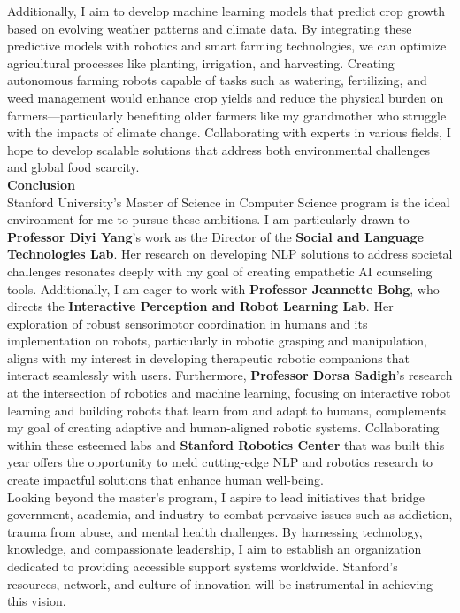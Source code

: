 \documentclass{article}
\begin{document}
Additionally, I aim to develop machine learning models that predict crop growth based on evolving weather patterns and climate data. By integrating these predictive models with robotics and smart farming technologies, we can optimize agricultural processes like planting, irrigation, and harvesting. Creating autonomous farming robots capable of tasks such as watering, fertilizing, and weed management would enhance crop yields and reduce the physical burden on farmers—particularly benefiting older farmers like my grandmother who struggle with the impacts of climate change. Collaborating with experts in various fields, I hope to develop scalable solutions that address both environmental challenges and global food scarcity.
\\

\textbf{Conclusion} \\
Stanford University's Master of Science in Computer Science program is the ideal environment for me to pursue these ambitions. I am particularly drawn to \textbf{Professor Diyi Yang}'s work as the Director of the \textbf{Social and Language Technologies Lab}. Her research on developing NLP solutions to address societal challenges resonates deeply with my goal of creating empathetic AI counseling tools. Additionally, I am eager to work with \textbf{Professor Jeannette Bohg}, who directs the \textbf{Interactive Perception and Robot Learning Lab}. Her exploration of robust sensorimotor coordination in humans and its implementation on robots, particularly in robotic grasping and manipulation, aligns with my interest in developing therapeutic robotic companions that interact seamlessly with users. Furthermore, \textbf{Professor Dorsa Sadigh}'s research at the intersection of robotics and machine learning, focusing on interactive robot learning and building robots that learn from and adapt to humans, complements my goal of creating adaptive and human-aligned robotic systems. Collaborating within these esteemed labs and \textbf{Stanford Robotics Center} that was built this year offers the opportunity to meld cutting-edge NLP and robotics research to create impactful solutions that enhance human well-being.
\\

Looking beyond the master's program, I aspire to lead initiatives that bridge government, academia, and industry to combat pervasive issues such as addiction, trauma from abuse, and mental health challenges. By harnessing technology, knowledge, and compassionate leadership, I aim to establish an organization dedicated to providing accessible support systems worldwide. Stanford's resources, network, and culture of innovation will be instrumental in achieving this vision.
\\
\end{document}
